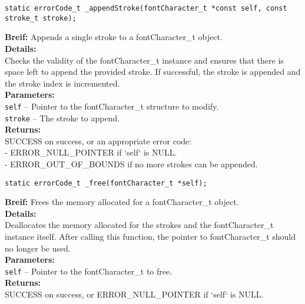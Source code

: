 \begin{verbatim}
static errorCode_t _appendStroke(fontCharacter_t *const self, const stroke_t stroke);
\end{verbatim}
\textbf{Breif:} Appends a single stroke to a fontCharacter\_t object. \\
\textbf{Details:} \\
\hspace*{1cm}Checks the validity of the fontCharacter\_t instance and ensures that there is space left to append the provided stroke. If successful, the stroke is appended and the stroke index is incremented. \\
\textbf{Parameters:} \\
\hspace*{1cm}\texttt{self} -- Pointer to the fontCharacter\_t structure to modify. \\
\hspace*{1cm}\texttt{stroke} -- The stroke to append. \\
\textbf{Returns:} \\
\hspace*{1cm}SUCCESS on success, or an appropriate error code: \\
\hspace*{1cm}- ERROR\_NULL\_POINTER if `self` is NULL. \\
\hspace*{1cm}- ERROR\_OUT\_OF\_BOUNDS if no more strokes can be appended. \\[1em]

\begin{verbatim}
static errorCode_t _free(fontCharacter_t *self);
\end{verbatim}
\textbf{Breif:} Frees the memory allocated for a fontCharacter\_t object. \\
\textbf{Details:} \\
\hspace*{1cm}Deallocates the memory allocated for the strokes and the fontCharacter\_t instance itself. After calling this function, the pointer to fontCharacter\_t should no longer be used. \\
\textbf{Parameters:} \\
\hspace*{1cm}\texttt{self} -- Pointer to the fontCharacter\_t to free. \\
\textbf{Returns:} \\
\hspace*{1cm}SUCCESS on success, or ERROR\_NULL\_POINTER if `self` is NULL. \\[1em]



